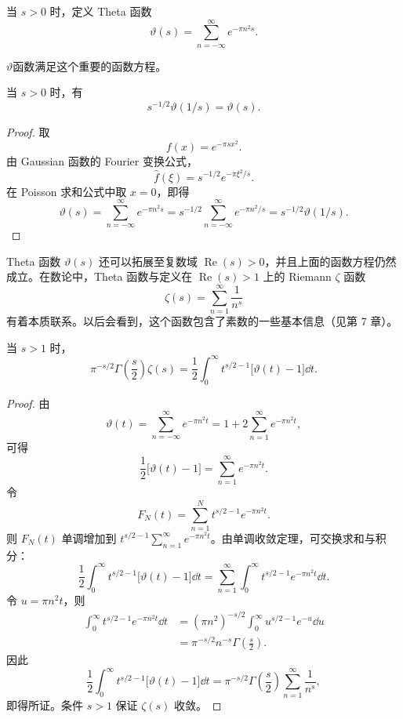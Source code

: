 \begin{definition}
	 当 $s>0$ 时，定义 Theta 函数
\[
\vartheta(s)=\sum_{n=-\infty}^{\infty}e^{-\pi n^2s}.
\]
\end{definition}
$\vartheta$函数满足这个重要的函数方程。
\begin{theorem}	\label{thm:theta-functional-equation}
	当 $s>0$ 时，有
	\[
	s^{-1/2}\vartheta(1/s)=\vartheta(s).
	\]
\end{theorem}

\begin{proof}
	取
	\[
	f(x)=e^{-\pi s x^2}.
	\]
	由 Gaussian 函数的 Fourier 变换公式，
	\[
	\widehat f(\xi)=s^{-1/2}e^{-\pi\xi^2/s}.
	\]
	在 Poisson 求和公式中取 $x=0$，即得
	\[
	\vartheta(s)
	=\sum_{n=-\infty}^{\infty}e^{-\pi n^2s}
	=s^{-1/2}\sum_{n=-\infty}^{\infty}e^{-\pi n^2/s}
	=s^{-1/2}\vartheta(1/s).
	\]
\end{proof}

Theta 函数 $\vartheta(s)$ 还可以拓展至复数域 $\operatorname{Re}(s)>0$，并且上面的函数方程仍然成立。在数论中，Theta 函数与定义在 $\operatorname{Re}(s)>1$ 上的 Riemann $\zeta$ 函数
\[
\zeta(s)=\sum_{n=1}^{\infty}\frac1{n^s}
\]
有着本质联系。以后会看到，这个函数包含了素数的一些基本信息（见第 7 章）。

\begin{proposition}	\label{prop:theta-zeta-mellin}
	当 $s>1$ 时，
	\[
	\pi^{-s/2}\Gamma\left(\frac{s}{2}\right)\zeta(s)
	=
	\frac12\int_0^{\infty}t^{s/2-1}\bigl[\vartheta(t)-1\bigr]\dd t.
	\]
\end{proposition}

\begin{proof}
	由
	\[
	\vartheta(t)
	=\sum_{n=-\infty}^{\infty}e^{-\pi n^2t}
	=1+2\sum_{n=1}^{\infty}e^{-\pi n^2t},
	\]
	可得
	\[
	\frac12\bigl[\vartheta(t)-1\bigr]
	=\sum_{n=1}^{\infty}e^{-\pi n^2t}.
	\]
	令
	\[
	F_N(t)=\sum_{n=1}^{N}t^{s/2-1}e^{-\pi n^2t}.
	\]
	则 $F_N(t)$ 单调增加到 $t^{s/2-1}\sum\limits_{n=1}^{\infty}e^{-\pi n^2t}$。由单调收敛定理，可交换求和与积分：
	\[
	\frac12\int_0^{\infty}t^{s/2-1}\bigl[\vartheta(t)-1\bigr]\dd t
	=
	\sum_{n=1}^{\infty}\int_0^{\infty}t^{s/2-1}e^{-\pi n^2t}\dd t.
	\]
	令 $u=\pi n^2t$，则
	\[
	\begin{aligned}
		\int_0^{\infty}t^{s/2-1}e^{-\pi n^2t}\dd t
		&=(\pi n^2)^{-s/2}
		\int_0^{\infty}u^{s/2-1}e^{-u}\dd u\\
		&=\pi^{-s/2}n^{-s}\Gamma\left(\frac{s}{2}\right).
	\end{aligned}
	\]
	因此
	\[
	\frac12\int_0^{\infty}t^{s/2-1}\bigl[\vartheta(t)-1\bigr]\dd t
	=
	\pi^{-s/2}\Gamma\left(\frac{s}{2}\right)
	\sum_{n=1}^{\infty}\frac1{n^s},
	\]
	即得所证。条件 $s>1$ 保证 $\zeta(s)$ 收敛。
\end{proof}

